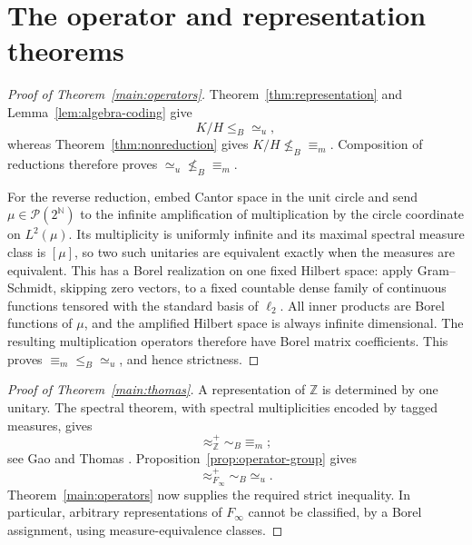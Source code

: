 \documentclass[11pt]{article}
\theoremstyle{definition}
\newcommand{\N}{\mathbb N}
\newcommand{\Prob}{\mathcal P}
\newcommand{\leB}{\mathrel{\leq_B}}
\newcommand{\nleB}{\mathrel{\nleq_B}}
\begin{document}
\section{The operator and representation theorems}
\begin{proof}[Proof of Theorem~\ref{main:operators}]
Theorem~\ref{thm:representation} and Lemma~\ref{lem:algebra-coding} give
\[
 K/H\leB{\simeq_u},
\]
whereas Theorem~\ref{thm:nonreduction} gives $K/H\nleB{\equiv_m}$.
Composition of reductions therefore proves
$ {\simeq_u}\nleB{\equiv_m}$.

For the reverse reduction, embed Cantor space in the unit circle and
send $\mu\in\Prob(2^\N)$ to the infinite amplification of multiplication
by the circle coordinate on $L^2(\mu)$. Its multiplicity is uniformly
infinite and its maximal spectral measure class is $[\mu]$, so two such
unitaries are equivalent exactly when the measures are equivalent.
This has a Borel realization on one fixed Hilbert space: apply
Gram--Schmidt, skipping zero vectors, to a fixed countable dense family
of continuous functions tensored with the standard basis of $\ell_2$.
All inner products are Borel functions of $\mu$, and the amplified
Hilbert space is always infinite dimensional. The resulting multiplication
operators therefore have Borel matrix coefficients.
This proves $ {\equiv_m}\leB{\simeq_u}$, and hence strictness.
\end{proof}

\begin{proof}[Proof of Theorem~\ref{main:thomas}]
A representation of $\mathbb Z$ is determined by one unitary.
The spectral theorem, with spectral multiplicities encoded by tagged
measures, gives
\[
 {\approx^+_{\mathbb Z}}\sim_B{\equiv_m};
\]
see Gao \cite[Section~8.5, p.~200]{Gao} and Thomas
\cite[Section~8]{Thomas15}. Proposition~\ref{prop:operator-group} gives
\[
 {\approx^+_{F_\infty}}\sim_B{\simeq_u}.
\]
Theorem~\ref{main:operators} now supplies the required strict inequality.
In particular, arbitrary representations of $F_\infty$ cannot be
classified, by a Borel assignment, using measure-equivalence classes.
\end{proof}

\end{document}
